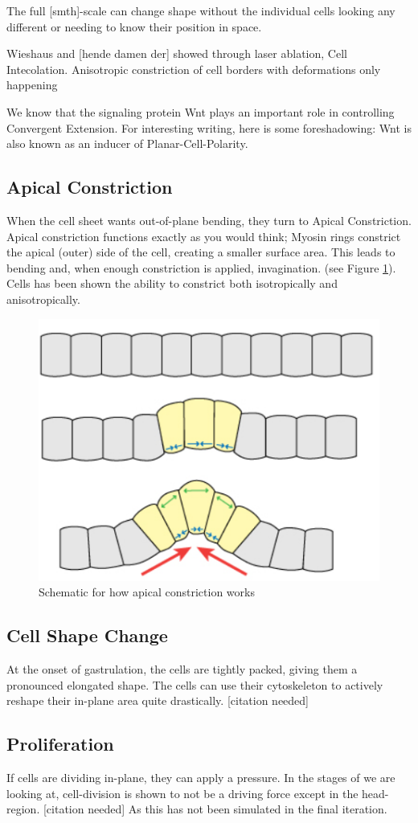 The full [smth]-scale can change shape without the individual cells looking any different or needing to know their position in space. 

Wieshaus and [hende damen der] showed through laser ablation, Cell Intecolation. Anisotropic constriction of cell borders with deformations only happening  



We know that the signaling protein Wnt plays an important role in controlling Convergent Extension. For interesting writing, here is some foreshadowing: Wnt is also known as an inducer of Planar-Cell-Polarity.

\subsection{ Apical Constriction }
\label{sec:ApicalConstriction}
When the cell sheet wants out-of-plane bending, they turn to Apical Constriction. Apical constriction functions exactly as you would think; Myosin rings constrict the apical (outer) side of the cell, creating a smaller surface area. This leads to bending and, when enough constriction is applied, invagination. (see Figure \ref{fig:apical-constriction}). Cells has been shown the ability to constrict both isotropically and anisotropically.

\begin{figure}[H]
    \centering
    \includegraphics[width=0.3\linewidth]{chapters/Theory/figures/apical_constriction_schematic.png}
    \caption{Schematic for how apical constriction works}
    \label{fig:apical-constriction}
\end{figure}


\subsection{Cell Shape Change}
At the onset of gastrulation, the cells are tightly packed, giving them a pronounced elongated shape. The cells can use their cytoskeleton to actively reshape their in-plane area quite drastically. [citation needed]

\subsection{Proliferation}
If cells are dividing in-plane, they can apply a pressure. In the stages of we are looking at, cell-division is shown to not be a driving force except in the head-region. [citation needed] As this has not been simulated in the final iteration.\\

